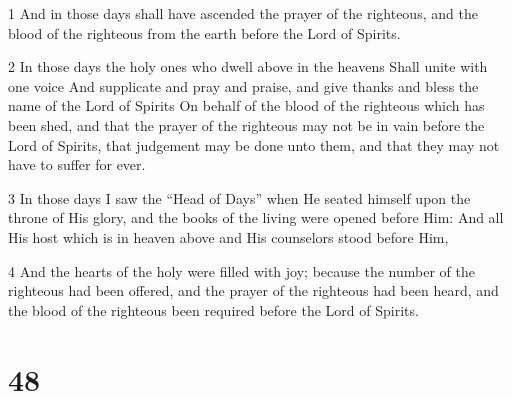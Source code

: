 \par 1 And in those days shall have ascended the prayer of the righteous, and the blood of the righteous from the earth before the Lord of Spirits.
\par 2 In those days the holy ones who dwell above in the heavens Shall unite with one voice And supplicate and pray and praise, and give thanks and bless the name of the Lord of Spirits On behalf of the blood of the righteous which has been shed, and that the prayer of the righteous may not be in vain before the Lord of Spirits, that judgement may be done unto them, and that they may not have to suffer for ever.
\par 3 In those days I saw the “Head of Days” when He seated himself upon the throne of His glory, and the books of the living were opened before Him: And all His host which is in heaven above and His counselors stood before Him,
\par 4 And the hearts of the holy were filled with joy; because the number of the righteous had been offered, and the prayer of the righteous had been heard, and the blood of the righteous been required before the Lord of Spirits.

\chapter{48}

